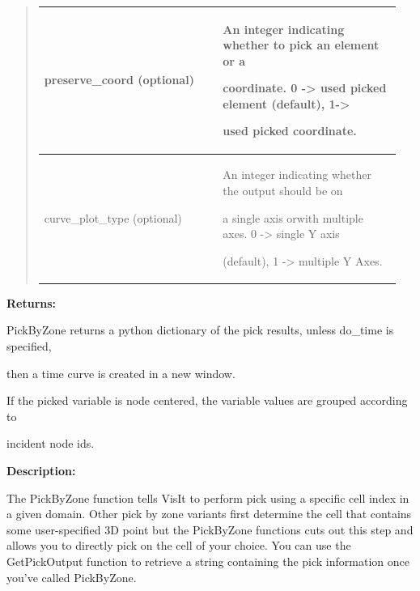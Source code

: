 \documentclass[letterpaper,10pt,english]{sphinxmanual}
\begin{document}
\begin{quote}
\begin{tabular}{|p{0.475\linewidth}|p{0.475\linewidth}|}
\hline
preserve\_coord (optional)
 & 
\begin{DUlineblock}{0em}
\item[] An integer indicating whether to pick an element or a
\item[] coordinate. 0 -\textgreater{} used picked element (default), 1-\textgreater{}
\item[] used picked coordinate.
\end{DUlineblock}
\\
\hline
curve\_plot\_type (optional)
 & 
\begin{DUlineblock}{0em}
\item[] An integer indicating whether the output should be on
\item[] a single axis orwith multiple axes. 0 -\textgreater{} single Y axis
\item[] (default), 1 -\textgreater{} multiple Y Axes.
\end{DUlineblock}
\\
\hline\end{tabular}

\end{quote}

\begin{DUlineblock}{0em}
\item[] 
\item[] \textbf{Returns:}
\item[] PickByZone returns a python dictionary of the pick results, unless do\_time is specified,
\item[] then a time curve is created in a new window.
\item[] If the picked variable is node centered, the variable values are grouped according to
\item[] incident node ids.
\item[] 
\item[] \textbf{Description:}
\item[] The PickByZone function tells VisIt to perform pick using a specific cell
index in a given domain. Other pick by zone variants first determine the
cell that contains some user-specified 3D point but the PickByZone
functions cuts out this step and allows you to directly pick on the cell of
your choice. You can use the GetPickOutput function to retrieve a string
containing the pick information once you've called PickByZone.
\end{DUlineblock}

\begin{DUlineblock}{0em}
\item[] 
\end{DUlineblock}
\end{document}
